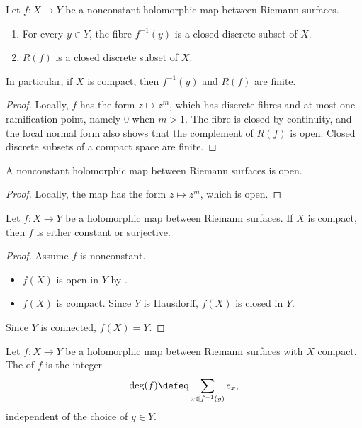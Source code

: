 \begin{corollary}\label{Cor:MF_discrete_fibres}
    Let $f : X \to Y$ be a nonconstant holomorphic map between Riemann surfaces.
    \begin{enumerate}[label=(\arabic*)]
        \item For every $y \in Y$, the fibre $f^{-1}(y)$ is a closed discrete subset of $X$.
        \item $R(f)$ is a closed discrete subset of $X$.
    \end{enumerate}
    In particular, if $X$ is compact, then $f^{-1}(y)$ and $R(f)$ are finite.
\end{corollary}

\begin{proof}
    Locally, $f$ has the form $z \mapsto z^m$, which has discrete fibres and at most one ramification point, namely $0$ when $m > 1$. The fibre is closed by continuity, and the local normal form also shows that the complement of $R(f)$ is open. Closed discrete subsets of a compact space are finite.
\end{proof}

\begin{corollary}\label{Cor:MF_open_map}
    A nonconstant holomorphic map between Riemann surfaces is open.
\end{corollary}

\begin{proof}
    Locally, the map has the form $z \mapsto z^m$, which is open.
\end{proof}

\begin{corollary}\label{Cor:MF_compact_surjective}
    Let $f : X \to Y$ be a holomorphic map between Riemann surfaces. If $X$ is compact, then $f$ is either constant or surjective.
\end{corollary}

\begin{proof}
    Assume $f$ is nonconstant.
    \begin{itemize}
        \item $f(X)$ is open in $Y$ by .
        \item $f(X)$ is compact. Since $Y$ is Hausdorff, $f(X)$ is closed in $Y$.
    \end{itemize}
    Since $Y$ is connected, $f(X) = Y$.
\end{proof}

\begin{thmdef}[Degree]\label{Def:MF_degree}
    Let $f : X \to Y$ be a holomorphic map between Riemann surfaces with $X$ compact. The  of $f$ is the integer
    \[
        \deg(f) \defeq \sum_{x \in f^{-1}(y)}e_x,
    \]
    independent of the choice of $y \in Y$.
\end{thmdef}

